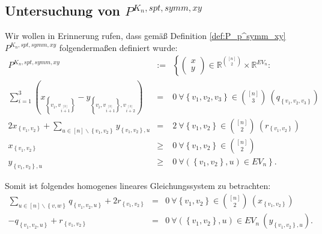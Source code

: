 \documentclass[10p,a4paper,BCOR = 12mm, DIV=15]{scrbook}
\begin{document}
{\subsection{Untersuchung von $P^{K_n, spt, symm, xy}$}

Wir wollen in Erinnerung rufen, dass gemäß Definition \ref{def:P_p^symm_xy} $P^{K_n, spt, symm, xy}$ folgendermaßen definiert wurde:
\begin{eqnarray*}
P^{K_n, spt, symm, xy} & := & \left\{ \left(\begin{array}{c}
x \\
y
\end{array}\right)\in\mathbb{R}^{[n]\choose 2}\times \mathbb{R}^{EV_n}: \right.
\nonumber \\
\sum_{i=1}^3 \left(x_{\left\{v_{i}, v_{i \stackrel{\left[3\right]}{+} 1}\right\}} -  y_{\left\{v_{i}, v_{i \stackrel{\left[3\right]}{+} 1}\right\}, v_{i \stackrel{\left[3\right]}{+} 2}}\right) & = & 0\ \forall \left\{v_1, v_2, v_3\right\}\in {[n] \choose 3}\ \left(q_{\left\{v_1, v_2, v_3\right\}}\right) \\
2 x_{\left\{v_1, v_2\right\}} + \sum_{u\in[n]\backslash\left\{v_1, v_2\right\}} y_{\left\{v_1, v_2\right\}, u} & = & 2\ \forall \left\{v_1, v_2\right\}\in {[n] \choose 2}\ \left(r_{\left\{v_1, v_2\right\}}\right) \\
x_{\left\{v_1, v_2\right\}} & \geq & 0 \ \forall \left\{v_1, v_2\right\} \in {\left[n\right] \choose 2} \nonumber \\
y_{\left\{v_1, v_2\right\}, u} & \geq & \left.0 \ \forall \left(\left\{v_1, v_2\right\}, u\right) \in EV_n\right\}. \nonumber
\end{eqnarray*}

Somit ist folgendes homogenes lineares Gleichungssystem zu betrachten:
\begin{eqnarray*}
\sum_{u\in[n]\backslash\left\{v, w\right\}} q_{\left\{v_1, v_2, u\right\}} + 2 r_{\left\{v_1, v_2\right\}} & = & 0 \ \forall \left\{v_1, v_2\right\}\in {[n] \choose 2} \ \left(x_{\left\{v_1, v_2\right\}}\right) \\
-q_{\left\{v_1, v_2, u\right\}} + r_{\left\{v_1, v_2\right\}} & = &  0\ \forall \left(\left\{v_1, v_2\right\}, u\right)\in EV_n  \ \left(y_{\left\{v_1, v_2\right\}, u}\right).
\end{eqnarray*}

}
\end{document}
